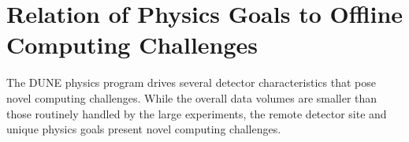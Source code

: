 \documentclass[../main-v1.tex]{subfiles}
\begin{document}


\section{Relation of Physics Goals to Offline Computing Challenges }

The DUNE physics program drives several detector characteristics that pose novel computing challenges.  While the overall data volumes are smaller than those routinely handled by the large  experiments, the remote detector site and unique physics goals present novel computing challenges. 
\end{document}
